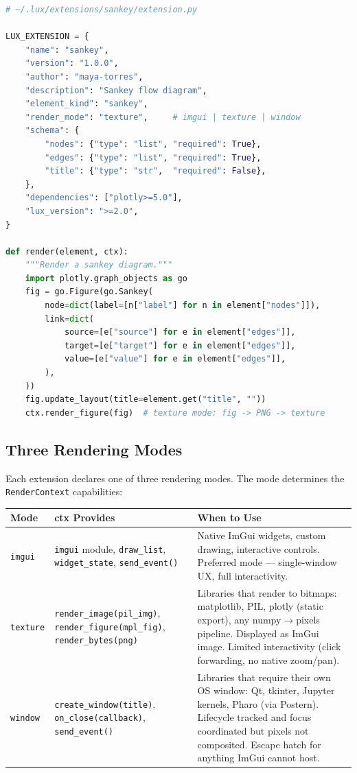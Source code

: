 \documentclass[a4paper,10pt]{article}
\newcommand{\ext}[1]{\texttt{#1}}
\begin{document}
\begin{lstlisting}[language=Python]
# ~/.lux/extensions/sankey/extension.py

LUX_EXTENSION = {
    "name": "sankey",
    "version": "1.0.0",
    "author": "maya-torres",
    "description": "Sankey flow diagram",
    "element_kind": "sankey",
    "render_mode": "texture",     # imgui | texture | window
    "schema": {
        "nodes": {"type": "list", "required": True},
        "edges": {"type": "list", "required": True},
        "title": {"type": "str",  "required": False},
    },
    "dependencies": ["plotly>=5.0"],
    "lux_version": ">=2.0",
}

def render(element, ctx):
    """Render a sankey diagram."""
    import plotly.graph_objects as go
    fig = go.Figure(go.Sankey(
        node=dict(label=[n["label"] for n in element["nodes"]]),
        link=dict(
            source=[e["source"] for e in element["edges"]],
            target=[e["target"] for e in element["edges"]],
            value=[e["value"] for e in element["edges"]],
        ),
    ))
    fig.update_layout(title=element.get("title", ""))
    ctx.render_figure(fig)  # texture mode: fig -> PNG -> texture
\end{lstlisting}

\subsection{Three Rendering Modes}

Each extension declares one of three rendering modes.  The mode
determines the \texttt{RenderContext} capabilities:

\begin{center}
\begin{tabularx}{\linewidth}{@{}lp{3cm}>{\raggedright\arraybackslash}X@{}}
\toprule
\textbf{Mode} & \textbf{ctx Provides} & \textbf{When to Use} \\
\midrule
\ext{imgui} &
  \texttt{imgui} module,
  \texttt{draw\_list},
  \texttt{widget\_state},
  \texttt{send\_event()} &
  Native ImGui widgets, custom drawing, interactive controls.
  Preferred mode --- single-window UX, full interactivity. \\
\ext{texture} &
  \texttt{render\_image(pil\_img)},
  \texttt{render\_figure(mpl\_fig)},
  \texttt{render\_bytes(png)} &
  Libraries that render to bitmaps: matplotlib, PIL, plotly
  (static export), any numpy$\to$pixels pipeline.  Displayed
  as ImGui image.  Limited interactivity
  (click forwarding, no native zoom/pan). \\
\ext{window} &
  \texttt{create\_window(title)},
  \texttt{on\_close(callback)},
  \texttt{send\_event()} &
  Libraries that require their own OS window: Qt, tkinter,
  Jupyter kernels, Pharo (via Postern).  Lifecycle tracked
  and focus coordinated but pixels not composited.
  Escape hatch for anything ImGui cannot host. \\
\bottomrule
\end{tabularx}
\end{center}
\end{document}
